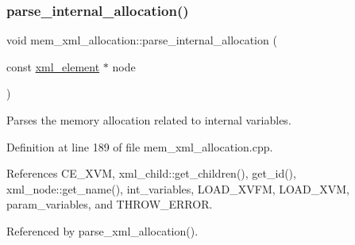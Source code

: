 \subsubsection{\texorpdfstring{parse\+\_\+internal\+\_\+allocation()}{parse\_internal\_allocation()}}
{\footnotesize\ttfamily void mem\+\_\+xml\+\_\+allocation\+::parse\+\_\+internal\+\_\+allocation (\begin{DoxyParamCaption}\item[{const \hyperlink{classxml__element}{xml\+\_\+element} $\ast$}]{node }\end{DoxyParamCaption})\hspace{0.3cm}{\ttfamily [private]}}



Parses the memory allocation related to internal variables. 



Definition at line 189 of file mem\+\_\+xml\+\_\+allocation.\+cpp.



References C\+E\+\_\+\+X\+VM, xml\+\_\+child\+::get\+\_\+children(), get\+\_\+id(), xml\+\_\+node\+::get\+\_\+name(), int\+\_\+variables, L\+O\+A\+D\+\_\+\+X\+V\+FM, L\+O\+A\+D\+\_\+\+X\+VM, param\+\_\+variables, and T\+H\+R\+O\+W\+\_\+\+E\+R\+R\+OR.



Referenced by parse\+\_\+xml\+\_\+allocation().

